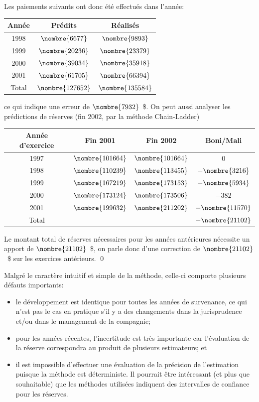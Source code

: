 \begin{exemple}
  Les paiements suivants ont donc été effectués dans l'année:
  \begin{center}
    \begin{tabular}{|c c c|}\hline
      Année & Prédits & Réalisés\\ \hline
      1998 & $\nombre{6677}$ & $\nombre{9893}$\\
      1999 & $\nombre{20236}$ &$\nombre{23379}$\\
      2000 & $\nombre{39034}$ &$\nombre{35918}$\\
      2001 & $\nombre{61705}$ &$\nombre{66394}$\\ \hline
      Total & $\nombre{127652}$ & $\nombre{135584}$\\ \hline
    \end{tabular}
  \end{center}
  ce qui indique une erreur de $\nombre{7932}$~\$. On peut aussi
  analyser les prédictions de réserves (fin 2002, par la méthode
  Chain-Ladder)
  \begin{center}
    \begin{tabular}{|c|c c c|}\hline
      Année d'exercice & Fin 2001 & Fin 2002 & Boni/Mali \\ \hline
      1997 & $\nombre{101664}$ & $\nombre{101664}$ & $0$\\
      1998 & $\nombre{110239}$ &  $\nombre{113455}$ & $-\nombre{3216}$ \\
      1999 & $\nombre{167219}$ &  $\nombre{173153}$& $-\nombre{5934}$\\
      2000 & $\nombre{173124}$ &  $\nombre{173506}$ & $-382$\\
      2001 & $\nombre{199632}$ &  $\nombre{211202}$ & $-\nombre{11570}$\\ \hline\hline
      Total & & & $-\nombre{21102}$ \\ \hline
    \end{tabular}
  \end{center}
  Le montant total de réserves nécessaires pour les années antérieures
  nécessite un apport de $\nombre{21102}$~\$, on parle donc d'une
  correction de $\nombre{21102}$~\$ sur les exercices antérieurs. %
  \qed
\end{exemple}

Malgré le caractère intuitif et simple de la méthode, celle-ci
comporte plusieurs défauts importants:
\begin{itemize}
\item le développement est identique pour toutes les années de
  survenance, ce qui n'est pas le cas en pratique s'il y a des
  changements dans la jurisprudence et/ou dans le management de la
  compagnie;
\item pour les années récentes, l'incertitude est très importante car
  l'évaluation de la réserve correspondra au produit de plusieurs
  estimateurs; et
\item il est impossible d'effectuer une évaluation de la précision de
  l'estimation puisque la méthode est déterministe. Il pourrait être
  intéressant (et plus que souhaitable) que les méthodes utilisées
  indiquent des intervalles de confiance pour les réserves.
\end{itemize}


